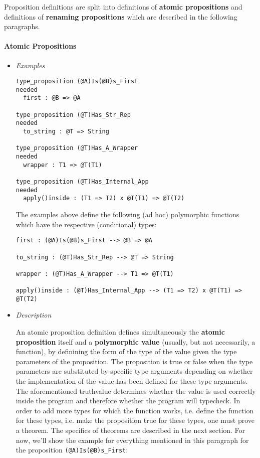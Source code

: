 \documentclass{article}
\begin{document}
Proposition definitions are split into definitions of \textbf{atomic
propositions} and definitions of \textbf{renaming propositions} which are
described in the following paragraphs.

\paragraph{Atomic Propositions}

\begin{itemize}
\item \textit{Examples}
\begin{verbatim}
type_proposition (@A)Is(@B)s_First
needed
  first : @B => @A

type_proposition (@T)Has_Str_Rep
needed
  to_string : @T => String

type_proposition (@T)Has_A_Wrapper
needed
  wrapper : T1 => @T(T1)

type_proposition (@T)Has_Internal_App
needed
  apply()inside : (T1 => T2) x @T(T1) => @T(T2)
\end{verbatim}
The examples above define the following (ad hoc) polymorphic functions which
have the respective (conditional) types:
\begin{verbatim}
first : (@A)Is(@B)s_First --> @B => @A

to_string : (@T)Has_Str_Rep --> @T => String

wrapper : (@T)Has_A_Wrapper --> T1 => @T(T1)

apply()inside : (@T)Has_Internal_App --> (T1 => T2) x @T(T1) => @T(T2)
\end{verbatim}

\item \textit{Description}

An atomic proposition definition defines simultaneously the \textbf{atomic
proposition} itself and a \textbf{polymorphic value} (usually, but not
necessarily, a function), by definining the form of the type of the value given
the type parameters of the proposition. The proposition is true or false when
the type parameters are substituted by specific type arguments depending on
whether the implementation of the value has been defined for these type
arguments. The aforementioned truthvalue determines whether the value is used
correctly inside the program and therefore whether the program will typecheck.
In order to add more types for which the function works, i.e.  define the
function for these types, i.e. make the proposition true for these types, one
must prove a theorem. The specifics of theorems are described in the next
section. For now, we'll show the example for everything mentioned in this
paragraph for the proposition \texttt{(@A)Is(@B)s_First}:


\end{itemize}
\end{document}
